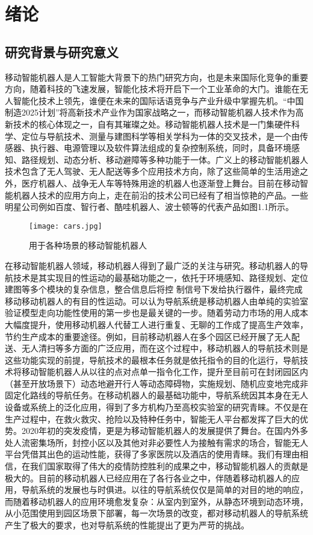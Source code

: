 
\chapter{绪论}

\section{研究背景与研究意义}
移动智能机器人是人工智能大背景下的热门研究方向，也是未来国际化竞争的重要方向，随着科技的飞速发展，智能化技术将开启下一个工业革命的大门。谁能在无人智能化技术上领先，谁便在未来的国际话语竞争与产业升级中掌握先机。“中国制造2025计划”将高新技术产业作为国家战略之一，而移动智能机器人技术作为高新技术的核心体现之一，自有其璀璨之处。移动智能机器人技术是一门集硬件科学、定位与导航技术、测量与建图科学等相关学科为一体的交叉技术，是一个由传感器、执行器、电源管理以及软件算法组成的复杂控制系统，同时，具备环境感知、路径规划、动态分析、移动避障等多种功能于一体。广义上的移动智能机器人技术包含了无人驾驶、无人配送等多个应用技术方向，除了这些简单的生活用途之外，医疗机器人、战争无人车等特殊用途的机器人也逐渐登上舞台。目前在移动智能机器人技术的应用方向上，走在前沿的技术公司已经有了相当惊艳的产品。一些明星公司例如百度、智行者、酷哇机器人、波士顿等的代表产品如图1.1所示。

\begin{figure}[ht]
  \centering
  \texttt{[image: cars.jpg]}
  \caption{用于各种场景的移动智能机器人}
\end{figure}

在移动智能机器人领域，移动机器人得到了最广泛的关注与研究。移动机器人的导航技术是其实现目的性运动的最基础功能之一，依托于环境感知、路径规划、定位建图等多个模块的复杂信息，整合信息后将控 制信号下发给执行器件，最终完成移动移动机器人的有目的性运动。可以认为导航系统是移动机器人由单纯的实验室验证模型走向功能性使用的第一步也是最关键的一步。随着劳动力市场的用人成本大幅度提升，使用移动机器人代替工人进行重复、无聊的工作成了提高生产效率，节约生产成本的重要途径。例如，目前移动机器人在多个园区已经开展了无人配送、无人清扫等多方面的广泛应用，而在这个过程中，移动机器人的导航技术则是这些功能实现的前提，导航技术的最根本任务就是依托指令的目的化运行，导航技术将移动智能机器人从以往的点对点单一指令化工作，提升至目前可在封闭园区内（甚至开放场景下）动态地避开行人等动态障碍物，实施规划、随机应变地完成非固定化路线的导航任务。在移动机器人的最基础功能中，导航系统因其本身在无人设备或系统上的泛化应用，得到了多方机构乃至高校实验室的研究青睐。不仅是在生产过程中，在救火救灾、抢险以及特种任务中，智能无人平台都发挥了巨大的优势。2020年初的突发疫情，更是为移动智能机器人的发展提供了舞台。在国内外多处人流密集场所，封控小区以及其他对非必要性人为接触有需求的场合，智能无人平台凭借其出色的运动性能，获得了多家医院以及酒店的使用青睐。我们有理由相信，在我们国家取得了伟大的疫情防控胜利的成果之中，移动智能机器人的贡献是极大的。目前的移动机器人已经应用在了各行各业之中，伴随着移动机器人的应用，导航系统的发展也与时俱进。以往的导航系统仅仅是简单的对目的地的响应，而随着移动机器人的应用环境愈发复杂：从室内到室外，从静态环境到动态环境，从小范围使用到园区场景下部署，每一次场景的改变，都对移动机器人的导航系统产生了极大的要求，也对导航系统的性能提出了更为严苛的挑战。

